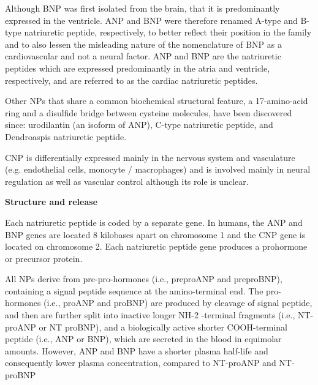 \documentclass[14pt,a4paper,onecolumn]{extarticle}
\begin{document}
Although BNP was first isolated from the brain, that it is predominantly expressed in the ventricle. ANP and BNP were therefore renamed A-type and B-type natriuretic peptide, respectively, to better reflect their position in the family and to also lessen the misleading nature of the nomenclature of BNP as a cardiovascular and not a neural factor. ANP and BNP are the natriuretic peptides which are expressed predominantly in the atria and ventricle, respectively, and are referred to as the cardiac natriuretic peptides. \citep{Suzuki2001}

Other NPs that share a common biochemical structural feature, a 17-amino-acid ring and a disulfide bridge between cysteine molecules, have been discovered since: urodilantin (an isoform of ANP), C-type natriuretic peptide, and Dendroaspis natriuretic peptide. \citep{Gaggin2014} %

CNP is differentially expressed mainly in the nervous system and vasculature (e.g. endothelial cells, monocyte / macrophages) and is involved mainly in neural regulation as well as vascular control although its role is unclear. \citep{Suzuki2001} %


\textbf{Structure and release}

Each natriuretic peptide is coded by a separate gene. In humans, the ANP and BNP genes are located 8 kilobases apart on chromosome 1 and the CNP gene is located on chromosome 2. Each natriuretic peptide gene produces a prohormone or precursor protein. \citep{Suzuki2001} %

All NPs derive from pre-pro-hormones (i.e., preproANP and preproBNP), containing a signal peptide sequence at the amino-terminal end. The pro-hormones (i.e., proANP and proBNP) are produced by cleavage of signal peptide, and then are further split into inactive longer NH-2 -terminal fragments (i.e., NT-proANP or NT proBNP), and a biologically active shorter COOH-terminal peptide (i.e., ANP or BNP), which are secreted in the blood in equimolar amounts. However, ANP and BNP have a shorter plasma half-life and consequently lower plasma concentration, compared to NT-proANP and NT-proBNP \citep{bib35} \citep{bib36} \citep{bib37} %
\end{document}
